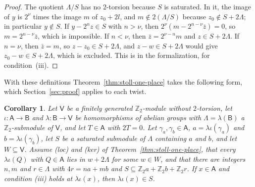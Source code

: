 \documentclass[11pt]{amsart}
\newtheorem{corollary}[theorem]{Corollary}
\theoremstyle{definition}
\numberwithin{equation}{section}
\newcommand{\Zt}{\mathbb{Z}_2}
\newcommand{\lean}[1]{\ignorespaces}
\begin{document}
\begin{proof}
The quotient $\Lambda/S$ has no $2$-torsion because $S$ is saturated. In it, the image of $y$ is $2^\nu$ times the image $m$ of $z_0+2l$, and $m\notin2(\Lambda/S)$ because $z_0\notin S+2\Lambda$; in particular $y\notin S$. If $y-2^nz\in S$ with $n>\nu$, then $2^\nu(m-2^{n-\nu}\bar z)=0$, so $m=2^{n-\nu}\bar z$, which is impossible. If $n<\nu$, then $\bar z=2^{\nu-n}m$ and $z\in S+2\Lambda$. If $n=\nu$, then $\bar z=m$, so $z-z_0\in S+2\Lambda$, and $z-w\in S+2\Lambda$ would give $z_0-w\in S+2\Lambda$, which is excluded. This is  in the formalization, for condition~(iii).
\end{proof}

With these definitions Theorem~\ref{thm:stoll-one-place} takes the following form, which Section~\ref{sec:proof} applies to each twist.

\begin{corollary}\label{cor:stoll-sat}\lean{FurioLombardo.M3a.twist_sat, FurioLombardo.M3a.stoll_sat}
Let $\mathsf V$ be a finitely generated $\Zt$-module without $2$-torsion, let $\iota:\mathsf A\to\mathsf B$ and $\lambda:\mathsf B\to\mathsf V$ be homomorphisms of abelian groups with $\Lambda=\lambda(\mathsf B)$ a $\Zt$-submodule of $\mathsf V$, and let $T\in\mathsf A$ with $2T=0$. Let $\gamma_a,\gamma_b\in\mathsf A$, $a=\lambda\iota(\gamma_a)$ and $b=\lambda\iota(\gamma_b)$, let $S$ be a saturated submodule of $\Lambda$ containing $a$ and $b$, and let $W\subseteq\mathsf V$. Assume (loc) and (ker) of Theorem~\ref{thm:stoll-one-place}, that every $\lambda\iota(Q)$ with $Q\in\mathsf A$ lies in $w+2\Lambda$ for some $w\in W$, and that there are integers $n,m$ and $r\in\Lambda$ with $4r=na+mb$ and $S\subseteq\Zt a+\Zt b+\Zt r$. If $x\in\mathsf A$ and condition (iii) holds at $\lambda\iota(x)$, then $\lambda\iota(x)\in S$.
\end{corollary}
\end{document}
